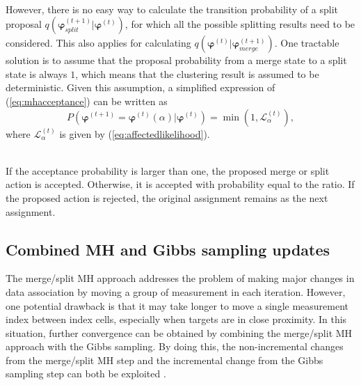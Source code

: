 ~\\
However, there is no easy way to calculate the transition probability of a split proposal $q(\boldsymbol{\varphi}^{(t+1)}_{split}|\boldsymbol{\varphi}^{(t)})$, for which all the possible splitting results need to be considered. This also applies for calculating $q(\boldsymbol{\varphi}^{(t)}|\boldsymbol{\varphi}^{(t+1)}_{merge})$. One tractable solution is to assume that the proposal probability from a merge state to a split state is always $1$, which means that the clustering result is assumed to be deterministic. Given this assumption, a simplified expression of (\ref{eq:mhacceptance}) can be written as
\begin{equation}
    P(\boldsymbol{\varphi}^{(t+1)}=\boldsymbol{\varphi}^{(t)}(\alpha)|\boldsymbol{\varphi}^{(t)}) = \min(1,\mathcal{L}^{(t)}_{\alpha}),
\end{equation}
where $\mathcal{L}^{(t)}_{\alpha}$ is given by (\ref{eq:affectedlikelihood}). 

~\\
If the acceptance probability is larger than one, the proposed merge or split action is accepted. Otherwise, it is accepted with probability equal to the ratio. If the proposed action is rejected, the original assignment remains as the next assignment. 



\subsection{Combined MH and Gibbs sampling updates}
The merge/split MH approach addresses the problem of making major changes in data association by moving a group of measurement in each iteration. However, one potential drawback is that it may take longer to move a single measurement index between index cells, especially when targets are in close proximity. In this situation, further convergence can be obtained by combining the merge/split MH approach with the Gibbs sampling. By doing this, the non-incremental changes from the merge/split MH step and the incremental change from the Gibbs sampling step can both be exploited \cite{mergesplit}. 